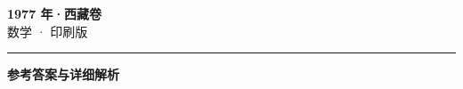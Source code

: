\documentclass[zihao=5, a4paper]{ctexart}
\begin{document}
\begin{center}
  {\Large\bfseries 1977 年·西藏卷}\\[4pt]
  {\large 数学 · 印刷版}
\end{center}
\medskip
{}

\par\bigskip\hrule\bigskip
{}
\begin{center}{\large\bfseries 参考答案与详细解析}\end{center}
\smallskip

\end{document}
